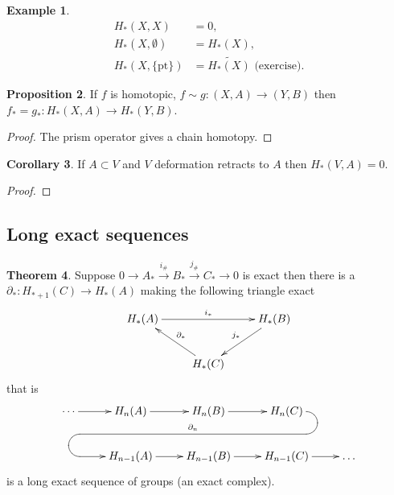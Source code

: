 \documentclass[12pt]{article}
\theoremstyle{definition}
\newtheorem{thm}{Theorem}[subsection]
\newtheorem{cor}[thm]{Corollary}
\newtheorem{prop}[thm]{Proposition}
\theoremstyle{definition}
\newtheorem{ex}[thm]{Example}
\renewcommand{\H}{H_*}
\begin{document}
\begin{ex}
\begin{align*}
\H(X,X) &= 0,\\
\H(X,\emptyset) &= \H(X),\\
\H(X,\{\mathrm{pt}\}) &= \tilde{\H(X)} \text{ (exercise)}.
\end{align*}
\end{ex}

\begin{prop}
If $f$ is homotopic, $f\sim g\colon (X,A) \to (Y,B)$ then $f_* = g_*\colon\H(X,A) \to \H(Y,B)$.
\end{prop}
\begin{proof}
The prism operator gives a chain homotopy.
\end{proof}
\begin{cor}
If $A \subset V$ and $V$ deformation retracts to $A$ then $\H(V,A) = 0$.
\end{cor}
\begin{proof}

\end{proof}

\subsection{Long exact sequences}
\begin{thm}
Suppose $ 0\to A_* \xrightarrow{i_\#} B_* \xrightarrow{j_\#} C_* \to 0$ is exact then there is a $\partial_*\colon H_{* + 1}(C) \to H_*(A)$ making the following triangle exact
\[
\xymatrix
{
 \H(A) \ar[rr]^{i_*}& &\H(B)\ar[dl]_{j_*} \\
 &\H(C) \ar[ul]_{\partial_*}&
}
\]
that is
\[
\xymatrix{ \cdots\ar[r] & H_n(A) \ar[r]&
H_n(B) \ar[r] & H_n(C)\ar `r[d] `[l]
`[llld]_{\partial_n} `[dll] [dll]\\
& H_{n-1}(A) \ar[r] & H_{n-1}(B)
\ar[r] & H_{n-1}(C)\ar[r] & {\dots} }
\]
is a long exact sequence of groups (an exact complex).
\end{thm}
\end{document}
